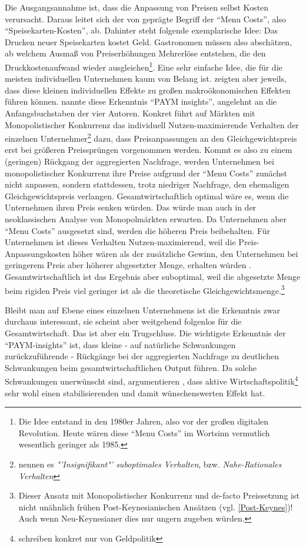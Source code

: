 Die Ausgangsannahme ist, dass die Anpassung von Preisen selbst Kosten verursacht. Daraus leitet sich der von \textcite{Mankiw1985b} geprägte Begriff der "`Menu Costs"', also "`Speisekarten-Kosten"', ab. Dahinter steht folgende exemplarische Idee: Das Drucken neuer Speisekarten kostet Geld. Gastronomen müssen also abschätzen, ab welchem Ausmaß von Preiserhöhungen Mehrerlöse entstehen, die den Druckkostenaufwand wieder ausgleichen\footnote{Die Idee entstand in den 1980er Jahren, also vor der großen digitalen Revolution. Heute wären diese "`Menu Costs"' im Wortsinn vermutlich wesentlich geringer als 1985.}. Eine sehr einfache Idee, die für die meisten individuellen Unternehmen kaum von Belang ist. \textcite{Akerlof1985, Mankiw1985b, Parkin1986} zeigten aber jeweils, dass diese kleinen individuellen Effekte zu großen makroökonomischen Effekten führen können. \textcite{Rotemberg1987} nannte diese Erkenntnis "`PAYM insights"', angelehnt an die Anfangsbuchstaben der vier Autoren. Konkret führt auf Märkten mit Monopolistischer Konkurrenz das individuell Nutzen-maximierende Verhalten der einzelnen Unternehmer\footnote{\textcite[S. 823]{Akerlof1985} nennen es \textit{"'Insignifikant"' suboptimales Verhalten}, bzw. \textit{Nahe-Rationales Verhalten}} dazu, dass Preisanpassungen an den Gleichgewichtspreis erst bei größeren Preissprüngen vorgenommen werden.  Kommt es also zu einem (geringen) Rückgang der aggregierten Nachfrage, werden Unternehmen bei monopolistischer Konkurrenz ihre Preise aufgrund der "`Menu Costs"' zunächst nicht anpassen, sondern stattdessen, trotz niedriger Nachfrage, den ehemaligen Gleichgewichtspreis verlangen. Gesamtwirtschaftlich optimal wäre es, wenn die Unternehmen ihren Preis senken würden. Das würde man auch in der neoklassischen Analyse von Monopolmärkten erwarten. Da Unternehmen aber "`Menu Costs"' ausgesetzt sind, werden die höheren Preis beibehalten. Für Unternehmen ist dieses Verhalten Nutzen-maximierend, weil die Preis-Anpassungskosten höher wären als der zusätzliche Gewinn, den Unternehmen bei geringerem Preis aber höherer abgesetzter Menge, erhalten würden \parencite[S. 372]{Snowdon2005}. Gesamtwirtschaftlich ist das Ergebnis aber suboptimal, weil die abgesetzte Menge beim rigiden Preis viel geringer ist als die theoretische Gleichgewichtsmenge.\footnote{Dieser Ansatz mit Monopolistischer Konkurrenz und de-facto Preissetzung ist nicht unähnlich frühen Post-Keynesianischen Ansätzen (vgl. \ref{Post-Keynes})! Auch wenn Neu-Keynesianer dies nur ungern zugeben würden.} 

Bleibt man auf Ebene eines einzelnen Unternehmens ist die Erkenntnis zwar durchaus interessant, sie scheint aber weitgehend folgenlos für die Gesamtwirtschaft. Das ist aber ein Trugschluss. Die wichtigste Erkenntnis der "`PAYM-insights"' ist, dass kleine - auf natürliche Schwankungen zurückzuführende - Rückgänge bei der aggregierten Nachfrage zu deutlichen Schwankungen beim gesamtwirtschaftlichen Output führen\parencite[S. 375]{Snowdon2005}. Da solche Schwankungen unerwünscht sind, argumentieren \textcite{Akerlof1985}, dass aktive Wirtschaftspolitik\footnote{\textcite[S.837]{Akerlof1985} schreiben konkret nur von Geldpolitik} sehr wohl einen stabilisierenden und damit wünschenswerten Effekt hat.



